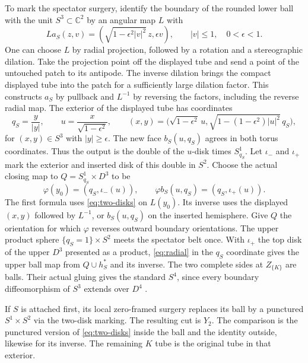 \documentclass[11pt,letterpaper]{article}
\numberwithin{equation}{section}
\theoremstyle{remark}
\begin{document}
To mark the spectator surgery, identify the boundary of the
rounded lower ball with the unit \(S^3\subset\mathbb C^2\)
by an angular map \(L\) with
\[
 L a_S(z,v)=(\sqrt{1-\epsilon^2|v|^2}\,z,\epsilon v),
 \qquad |v|\le1,\quad 0<\epsilon<1.
\]
One can choose \(L\) by radial projection, followed by a rotation
and a stereographic dilation. Take the projection point off
the displayed tube and send a point of the untouched patch to
its antipode. The inverse dilation brings the compact displayed
tube into the patch for a sufficiently large dilation factor.
This constructs \(a_S\) by pullback and \(L^{-1}\) by reversing
the factors, including the reverse radial map. The exterior
of the displayed tube has coordinates
\begin{equation}\label{eq:two-disks}
 q_S=\frac{y}{|y|},\qquad u=\frac{x}{\sqrt{1-\epsilon^2}},
 \qquad
 (x,y)=\bigl(\sqrt{1-\epsilon^2}\,u,
       \sqrt{1-(1-\epsilon^2)|u|^2}\,q_S\bigr),
\end{equation}
for \((x,y)\in S^3\) with \(|y|\ge\epsilon\).
The new face \(b_S(u,q_S)\) agrees in both torus coordinates.
Thus the output is the double of the \(u\)-disk times
\(S^1_{q_S}\). Let \(\iota_-\) and \(\iota_+\) mark the exterior
and inserted disk of this double in \(S^2\). Choose the actual
closing map to \(Q=S^1_{q_S}\times D^3\) to be
\[
 \varphi(y_0)=(q_S,\iota_-(u)),\qquad
 \varphi b_S(u,q_S)=(q_S,\iota_+(u)).
\]
The first formula uses \eqref{eq:two-disks} on \(L(y_0)\). Its
inverse uses the displayed \((x,y)\) followed by \(L^{-1}\),
or \(b_S(u,q_S)\) on the inserted hemisphere. Give \(Q\) the
orientation for which \(\varphi\) reverses outward boundary
orientations. The upper product sphere \(\{q_S=1\}\times S^2\) meets the spectator belt once.
With \(\iota_+\) the top disk of the upper \(D^3\) presented
as a product, \eqref{eq:radial} in the \(q_S\) coordinate
gives the upper ball map from \(Q\cup h_S^*\) and its inverse.
The two complete sides at \(Z_{\{K\}}\) are balls. Their
actual gluing gives the standard \(S^4\), since every boundary
diffeomorphism of \(S^3\) extends over \(D^4\)
\cite[p.~553]{Hatcher1983Smale}.

If \(S\) is attached first, its local zero-framed surgery
replaces its ball by a punctured \(S^1\times S^2\) via the
two-disk marking. The resulting cut is \(Y_2\). The comparison
is the punctured version of \eqref{eq:two-disks} inside the
ball and the identity outside, likewise for its inverse.
The remaining \(K\) tube is the original tube in that exterior.
\end{document}
